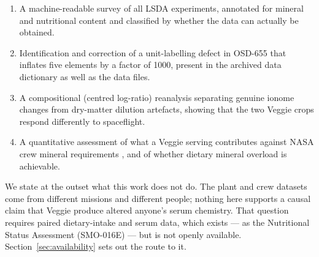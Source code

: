 \begin{smamethod}[title=Contributions]
\begin{enumerate}\itemsep2pt
  \item A machine-readable survey of all \LSDATotal{} LSDA experiments,
        annotated for mineral and nutritional content and classified by whether
        the data can actually be obtained.
  \item Identification and correction of a unit-labelling defect in OSD-655
        that inflates five elements by a factor of 1000, present in the archived
        data dictionary as well as the data files.
  \item A compositional (centred log-ratio) reanalysis separating genuine
        ionome changes from dry-matter dilution artefacts, showing that the two
        Veggie crops respond differently to spaceflight.
  \item A quantitative assessment of what a Veggie serving contributes against
        NASA crew mineral requirements \citep{jsc67378}, and of whether dietary
        mineral overload is achievable.
\end{enumerate}
\end{smamethod}

We state at the outset what this work does not do. The plant and crew datasets
come from different missions and different people; nothing here supports a
causal claim that Veggie produce altered anyone's serum chemistry. That question
requires paired dietary-intake and serum data, which exists --- as the
Nutritional Status Assessment (SMO-016E) --- but is not openly available.
Section~\ref{sec:availability} sets out the route to it.
